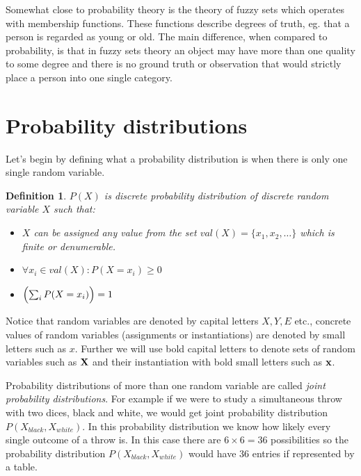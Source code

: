 \documentclass[english,cover]{fitthesis} %
\newtheorem{math_def}{Definition}[chapter] %
\newcommand{\term}[1]{\emph{#1}}           %
\newcommand{\vars}[1]{{\bold{#1}}}         %
\begin{document}
Somewhat close to probability theory is the theory of fuzzy sets which operates with membership functions. These functions describe degrees of truth, eg. that a person is regarded as young or old. The main difference, when compared to probability, is that in fuzzy sets theory an object may have more than one quality to some degree and there is no ground truth or observation that would strictly place a person into one single category.


\section{Probability distributions}
Let's begin by defining what a probability distribution is when there is only one single random variable.
\begin{math_def}\label{def_prob_distribution}
    $P(X)$ is discrete probability distribution of discrete random variable $X$ such that:
    \begin{itemize}
        \item $X$ can be assigned any value from the set $val(X) = \lbrace x_1, x_2, \dots \rbrace$ which is finite or denumerable.
        \item $\forall x_i \in val(X): P(X = x_i) \geq 0$
        \item $\Bigl( \sum_i P(X = x_i) \Bigr) = 1$
    \end{itemize}
\end{math_def}

Notice that random variables are denoted by capital letters $X, Y, E$ etc., concrete values of random variables (assignments or instantiations) are denoted by small letters such as $x$. Further we will use bold capital letters to denote sets of random variables such as $\vars{X}$ and their instantiation with bold small letters such as $\vars{x}$.

Probability distributions of more than one random variable are called \term{joint probability distributions}. For example if we were to study a simultaneous throw with two dices, black and white, we would get joint probability distribution $P(X_{black},X_{white})$. In this probability distribution we know how likely every single outcome of a throw is. In this case there are $6 \times 6 = 36$ possibilities so the probability distribution $P(X_{black},X_{white})$ would have 36 entries if represented by a table.
\end{document}
